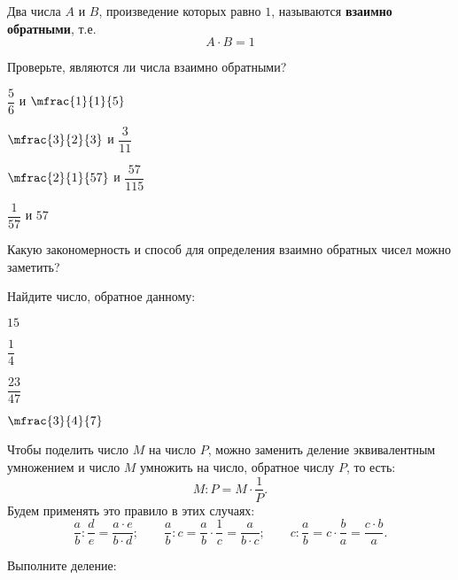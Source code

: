 %
%
\begin{class}[number=3]
	\begin{definit}
		Два числа \( A \) и \( B \), произведение которых равно \( 1 \), называются \textbf{взаимно обратными}, т.е.
		\[ A \cdot B = 1 \]
	\end{definit}
	\begin{listofex}
		\item Проверьте, являются ли числа взаимно обратными?
		\begin{enumcols}[itemcolumns=4]
			\item \( \dfrac{5}{6} \) и \( \mfrac{1}{1}{5} \)
			\item \( \mfrac{3}{2}{3} \) и \( \dfrac{3}{11} \)
			\item \( \mfrac{2}{1}{57} \) и \( \dfrac{57}{115} \)
			\item \( \dfrac{1}{57} \) и \( 57 \)
		\end{enumcols}
		Какую закономерность и способ для определения взаимно обратных чисел можно заметить?
		\item Найдите число, обратное данному:
		\begin{enumcols}[itemcolumns=4]
			\item \( 15 \)
			\item \( \dfrac{1}{4} \)
			\item \( \dfrac{23}{47} \)
			\item \( \mfrac{3}{4}{7} \)
		\end{enumcols}
	\end{listofex}
	\begin{definit}
		Чтобы поделить число \( M \) на число \( P \), можно заменить деление эквивалентным умножением и число \( M \) умножить на число, обратное числу \( P \), то есть:
		\[ M:P=M\cdot\dfrac{1}{P}. \]
		Будем применять это правило в этих случаях:
		\[ 
			\dfrac{a}{b}:\dfrac{d}{e}=\dfrac{a \cdot e}{b \cdot d};
			\qquad
			\dfrac{a}{b}:c=\dfrac{a}{b}\cdot\dfrac{1}{c}=\dfrac{a}{b \cdot c};
			\qquad
			c:\dfrac{a}{b}=c\cdot\dfrac{b}{a}=\dfrac{c \cdot b}{a}.
		\]
	\end{definit}
	\begin{listofex}
		\item Выполните деление:

\end{listofex}
\end{class}
